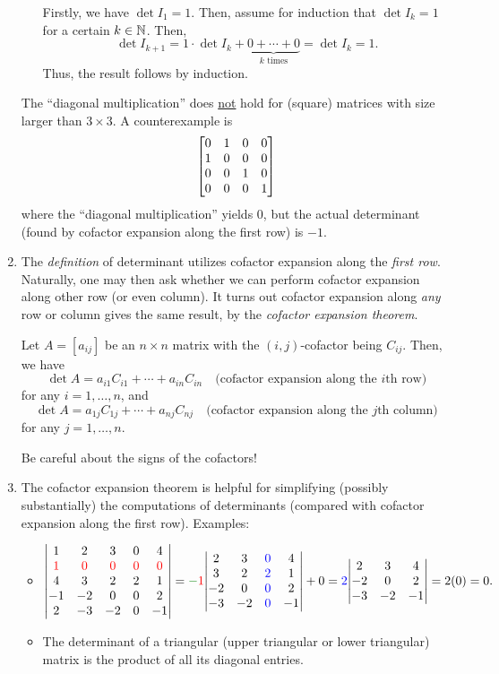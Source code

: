 \begin{enumerate}
\begin{itemize}
\begin{pf}
Firstly, we have \(\det I_1=1\). Then, assume for induction that \(\det I_k=1\)
for a certain \(k\in\mathbb{N}\). Then,
\[
\det I_{k+1}=1\cdot \det I_k+\underbrace{0+\dotsb+0}_{\text{\(k\) times}}
=\det I_k=1.
\]
Thus, the result follows by induction.
\end{pf}
\end{itemize}
\begin{warning}
The ``diagonal multiplication'' does \underline{not} hold for (square) matrices
with size larger than \(3\times  3\). A counterexample is
\[
\mqty[0&1&0&0\\ 1&0&0&0\\ 0&0&1&0\\ 0&0&0&1]
\]
where the ``diagonal multiplication'' yields \(0\), but the actual determinant
(found by cofactor expansion along the first row) is \(-1\).
\end{warning}
\item The \emph{definition} of determinant utilizes cofactor expansion along
the \emph{first row}. Naturally, one may then ask whether we can perform
cofactor expansion along other row (or even column). It turns out cofactor
expansion along \emph{any} row or column gives the same result, by the
\emph{cofactor expansion theorem}.

\begin{theorem}
\label{thm:cofactor-expansion}
Let \(A=[a_{ij}]\) be an \(n\times n\) matrix with the \((i,j)\)-cofactor being
\(C_{ij}\). Then, we have
\[
\det A=a_{i1}C_{i1}+\dotsb+a_{in}C_{in}\quad\text{(cofactor expansion along the \(i\)th row)}
\]
for any \(i=1,\dotsc,n\), and
\[
\det A=a_{1j}C_{1j}+\dotsb+a_{nj}C_{nj}\quad\text{(cofactor expansion along the \(j\)th column)}
\]
for any \(j=1,\dotsc,n\).
\end{theorem}
\begin{warning}
Be careful about the signs of the cofactors!
\end{warning}

\item The cofactor expansion theorem is helpful for simplifying (possibly
substantially) the computations of determinants (compared with cofactor
expansion along the first row). Examples:
\begin{itemize}
\item \(\displaystyle 
\mqty|
1&2&3&0&4\\
\rc{1}&\rc{0}&\rc{0}&\rc{0}&\rc{0}\\
4&3&2&2&1\\
-1&-2&0&0&2\\
2&-3&-2&0&-1
|
=\gc{-}\rc{1}\mqty|
2&3&\blc{0}&4\\
3&2&\blc{2}&1\\
-2&0&\blc{0}&2\\
-3&-2&\blc{0}&-1
|+0
=
\blc{2}\mqty|
2&3&4\\
-2&0&2\\
-3&-2&-1
|
=2(0)
=0.
\)
\item The determinant of a triangular (upper triangular or lower triangular)
matrix is the product of all its diagonal entries.


\end{itemize}
\end{enumerate}
